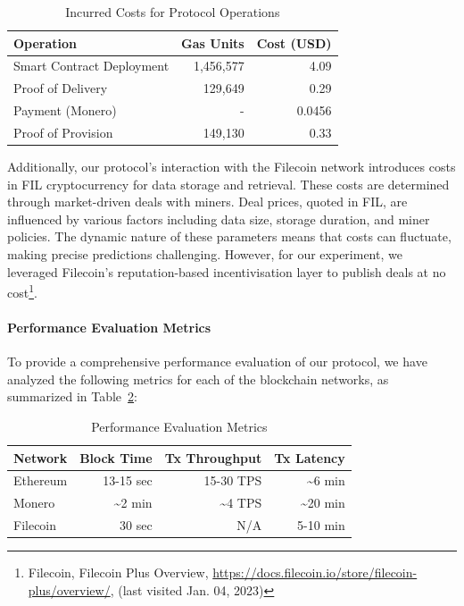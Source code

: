 \documentclass[pdftex,twocolumn,epjc3]{svjour3}
\begin{document}
\begin{table}
\caption{Incurred Costs for Protocol Operations}
\centering
\label{table:costs}
\begin{tabular}{lrr}
\hline
\textbf{Operation}            & \textbf{Gas Units} & \textbf{Cost (USD)} \\
\hline
Smart Contract Deployment     & 1,456,577          & 4.09                \\
Proof of Delivery             & 129,649            & 0.29                \\
Payment (Monero)              & -                  & 0.0456              \\
Proof of Provision            & 149,130            & 0.33                \\
\hline
\end{tabular}
\end{table}

Additionally, our protocol's interaction with the Filecoin network introduces costs in FIL cryptocurrency for data storage and retrieval. These costs are determined through market-driven deals with miners. Deal prices, quoted in FIL, are influenced by various factors including data size, storage duration, and miner policies. The dynamic nature of these parameters means that costs can fluctuate, making precise predictions challenging. However, for our experiment, we leveraged Filecoin's reputation-based incentivisation layer to publish deals at no cost\footnote{Filecoin, Filecoin Plus Overview, \url{https://docs.filecoin.io/store/filecoin-plus/overview/}, (last visited Jan. 04, 2023)}.

\paragraph{Performance Evaluation Metrics}

To provide a comprehensive performance evaluation of our protocol, we have analyzed the following metrics for each of the blockchain networks, as summarized in Table~\ref{table:performance}:

\begin{table}[h!]
\centering
\caption{Performance Evaluation Metrics}
\label{table:performance}
\begin{tabular}{lrrr}
\hline
\textbf{Network}     & \textbf{Block Time} & \textbf{Tx Throughput} & \textbf{Tx Latency} \\ \hline
Ethereum             & 13-15 sec       & 15-30 TPS                       & \textasciitilde{}6 min      \\
Monero               & \textasciitilde{}2 min & \textasciitilde{}4 TPS             & \textasciitilde{}20 min \\
Filecoin             & 30 sec & N/A\footnotemark{}            & 5-10 min  \\ 
\hline
\end{tabular}
\end{table}
\end{document}
